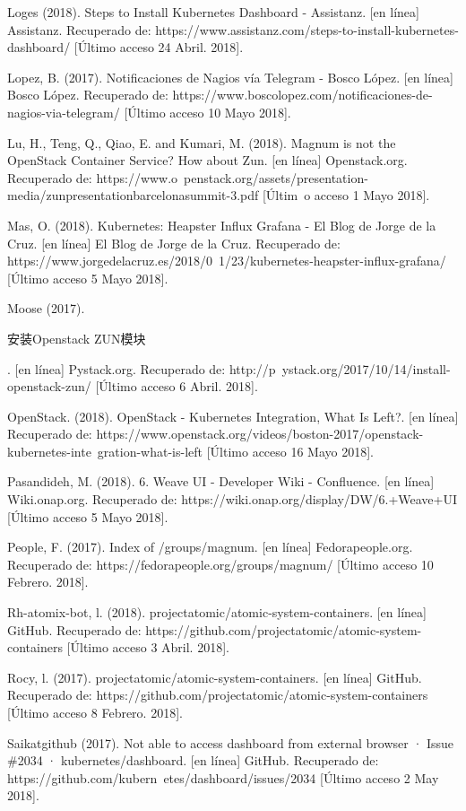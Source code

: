 Loges (2018). Steps to Install Kubernetes Dashboard - Assistanz. [en línea] Assistanz. Recuperado de: https://www.assistanz.com/steps-to-install-kubernetes-dashboard/ [Último acceso 24 Abril. 2018].

Lopez, B. (2017). Notificaciones de Nagios vía Telegram - Bosco López. [en línea] Bosco López. Recuperado de: https://www.boscolopez.com/notificaciones-de-nagios-via-telegram/ [Último acceso 10 Mayo 2018].


Lu, H., Teng, Q., Qiao, E. and Kumari, M. (2018). Magnum is not the OpenStack Container Service? How about Zun. [en línea] Openstack.org. Recuperado de: https://www.o\ penstack.org/assets/presentation-media/zunpresentationbarcelonasummit-3.pdf [Últim\ o acceso 1 Mayo 2018].

Mas, O. (2018). Kubernetes: Heapster Influx Grafana - El Blog de Jorge de la Cruz. [en línea] El Blog de Jorge de la Cruz. Recuperado de: https://www.jorgedelacruz.es/2018/0\ 1/23/kubernetes-heapster-influx-grafana/ [Último acceso 5 Mayo 2018].

Moose (2017). \begin{CJK*}{UTF8}{gbsn}安装Openstack ZUN模块\end{CJK*}. [en línea] Pystack.org. Recuperado de: http://p\ ystack.org/2017/10/14/install-openstack-zun/ [Último acceso 6 Abril. 2018].

OpenStack. (2018). OpenStack - Kubernetes Integration, What Is Left?. [en línea] Recuperado de: https://www.openstack.org/videos/boston-2017/openstack-kubernetes-inte\ gration-what-is-left [Último acceso 16 Mayo 2018].

Pasandideh, M. (2018). 6. Weave UI - Developer Wiki - Confluence. [en línea] Wiki.onap.org. Recuperado de: https://wiki.onap.org/display/DW/6.+Weave+UI [Último acceso 5 Mayo 2018].

People, F. (2017). Index of /groups/magnum. [en línea] Fedorapeople.org. Recuperado de: https://fedorapeople.org/groups/magnum/ [Último acceso 10 Febrero. 2018].

Rh-atomix-bot, l. (2018). projectatomic/atomic-system-containers. [en línea] GitHub. Recuperado de: https://github.com/projectatomic/atomic-system-containers [Último acceso 3 Abril. 2018].

Rocy, l. (2017). projectatomic/atomic-system-containers. [en línea] GitHub. Recuperado de: https://github.com/projectatomic/atomic-system-containers [Último acceso 8 Febrero. 2018].

Saikatgithub (2017). Not able to access dashboard from external browser · Issue \#2034 · kubernetes/dashboard. [en línea] GitHub. Recuperado de: https://github.com/kubern\ etes/dashboard/issues/2034 [Último acceso 2 May 2018].

